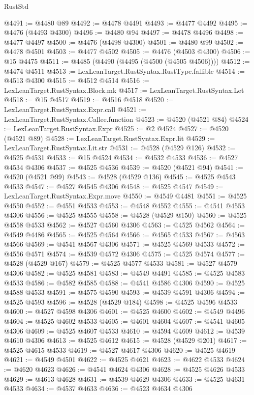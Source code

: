 \begin{lexlean}{RustStd}
\begin{coremodule}
@4491 := @4480 @89
@4492 := @4478 @4491
@4493 := @4477 @4492
@4495 := @4476 (@4493 @4300)
@4496 := @4480 @94
@4497 := @4478 @4496
@4498 := @4477 @4497
@4500 := @4476 (@4498 @4300)
@4501 := @4480 @99
@4502 := @4478 @4501
@4503 := @4477 @4502
@4505 := @4476 (@4503 @4300)
@4506 := @15 @4475
@4511 := @4485 (@4490 (@4495 (@4500 (@4505 @4506))))
@4512 := @4474 @4511
@4513 := LexLeanTarget.RustSyntax.RustType.fallible
@4514 := @4513 @4300
@4515 := @4512 @4514
@4516 := LexLeanTarget.RustSyntax.Block.mk
@4517 := LexLeanTarget.RustSyntax.Let
@4518 := @15 @4517
@4519 := @4516 @4518
@4520 := LexLeanTarget.RustSyntax.Expr.call
@4521 := LexLeanTarget.RustSyntax.Callee.function
@4523 := @4520 (@4521 @84)
@4524 := LexLeanTarget.RustSyntax.Expr
@4525 := @2 @4524
@4527 := @4520 (@4521 @89)
@4528 := LexLeanTarget.RustSyntax.Expr.lit
@4529 := LexLeanTarget.RustSyntax.Lit.str
@4531 := @4528 (@4529 @126)
@4532 := @4525 @4531
@4533 := @15 @4524
@4534 := @4532 @4533
@4536 := @4527 @4534 @4306
@4537 := @4525 @4536
@4539 := @4520 (@4521 @94)
@4541 := @4520 (@4521 @99)
@4543 := @4528 (@4529 @136)
@4545 := @4525 @4543 @4533
@4547 := @4527 @4545 @4306
@4548 := @4525 @4547
@4549 := LexLeanTarget.RustSyntax.Expr.move
@4550 := @4549 @4481
@4551 := @4525 @4550
@4552 := @4551 @4533
@4553 := @4548 @4552
@4555 := @4541 @4553 @4306
@4556 := @4525 @4555
@4558 := @4528 (@4529 @150)
@4560 := @4525 @4558 @4533
@4562 := @4527 @4560 @4306
@4563 := @4525 @4562
@4564 := @4549 @4486
@4565 := @4525 @4564
@4566 := @4565 @4533
@4567 := @4563 @4566
@4569 := @4541 @4567 @4306
@4571 := @4525 @4569 @4533
@4572 := @4556 @4571
@4574 := @4539 @4572 @4306
@4575 := @4525 @4574
@4577 := @4528 (@4529 @167)
@4579 := @4525 @4577 @4533
@4581 := @4527 @4579 @4306
@4582 := @4525 @4581
@4583 := @4549 @4491
@4585 := @4525 @4583 @4533
@4586 := @4582 @4585
@4588 := @4541 @4586 @4306
@4590 := @4525 @4588 @4533
@4591 := @4575 @4590
@4593 := @4539 @4591 @4306
@4594 := @4525 @4593
@4596 := @4528 (@4529 @184)
@4598 := @4525 @4596 @4533
@4600 := @4527 @4598 @4306
@4601 := @4525 @4600
@4602 := @4549 @4496
@4604 := @4525 @4602 @4533
@4605 := @4601 @4604
@4607 := @4541 @4605 @4306
@4609 := @4525 @4607 @4533
@4610 := @4594 @4609
@4612 := @4539 @4610 @4306
@4613 := @4525 @4612
@4615 := @4528 (@4529 @201)
@4617 := @4525 @4615 @4533
@4619 := @4527 @4617 @4306
@4620 := @4525 @4619
@4621 := @4549 @4501
@4622 := @4525 @4621
@4623 := @4622 @4533
@4624 := @4620 @4623
@4626 := @4541 @4624 @4306
@4628 := @4525 @4626 @4533
@4629 := @4613 @4628
@4631 := @4539 @4629 @4306
@4633 := @4525 @4631 @4533
@4634 := @4537 @4633
@4636 := @4523 @4634 @4306

\end{coremodule}
\end{lexlean}
